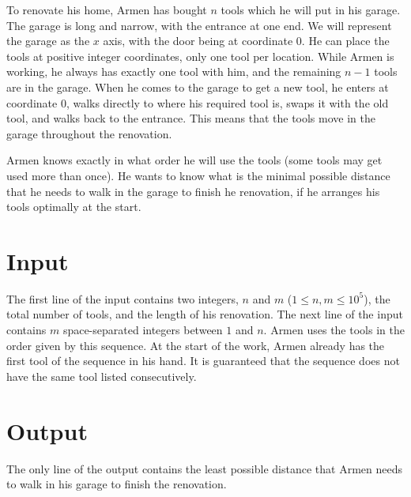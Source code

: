 
To renovate his home, Armen has bought $n$ tools which he will put in his garage.
The garage is long and narrow, with the entrance at one end.
We will represent the garage as the $x$ axis, with the door being at coordinate $0$.
He can place the tools at positive integer coordinates, only one tool per location.
While Armen is working, he always has exactly one tool with him, and the remaining $n - 1$ tools are in the garage.
When he comes to the garage to get a new tool, he enters at coordinate 0, walks directly to where his required tool is, swaps it with the old tool, and walks back to the entrance.
This means that the tools move in the garage throughout the renovation.

Armen knows exactly in what order he will use the tools (some tools may get used more than once).
He wants to know what is the minimal possible distance that he needs to walk in the garage to finish he renovation, if he arranges his tools optimally at the start.

\section*{Input}
The first line of the input contains two integers, $n$ and $m$ ($1 \leq n, m \leq 10^5$), the total number of tools, and the length of his renovation.
The next line of the input contains $m$ space-separated integers between $1$ and $n$.
Armen uses the tools in the order given by this sequence.
At the start of the work, Armen already has the first tool of the sequence in his hand.
It is guaranteed that the sequence does not have the same tool listed consecutively.

\section*{Output}
The only line of the output contains the least possible distance that Armen needs to walk in his garage to finish the renovation.
